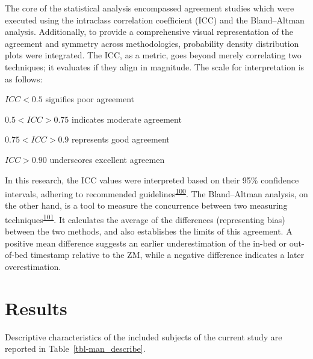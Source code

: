 \documentclass[
  9pt,
]{scrbook}
\begin{document}
The core of the statistical analysis encompassed agreement studies which
were executed using the intraclass correlation coefficient (ICC) and the
Bland--Altman analysis. Additionally, to provide a comprehensive visual
representation of the agreement and symmetry across methodologies,
probability density distribution plots were integrated. The ICC, as a
metric, goes beyond merely correlating two techniques; it evaluates if
they align in magnitude. The scale for interpretation is as follows:

\(ICC < 0.5\) signifies poor agreement

\(0.5 < ICC > 0.75\) indicates moderate agreement

\(0.75 < ICC > 0.9\) represents good agreement

\(ICC > 0.90\) underscores excellent agreemen

In this research, the ICC values were interpreted based on their 95\%
confidence intervals, adhering to recommended
guidelines\textsuperscript{\protect\hyperlink{ref-koo_guideline_2016}{100}}.
The Bland--Altman analysis, on the other hand, is a tool to measure the
concurrence between two measuring
techniques\textsuperscript{\protect\hyperlink{ref-bland_measuring_1999}{101}}.
It calculates the average of the differences (representing bias) between
the two methods, and also establishes the limits of this agreement. A
positive mean difference suggests an earlier underestimation of the
in-bed or out-of-bed timestamp relative to the ZM, while a negative
difference indicates a later overestimation.

\hypertarget{results}{%
\section{Results}\label{results}}

Descriptive characteristics of the included subjects of the current
study are reported in Table~\ref{tbl-man_describe}.

\begingroup

\footnotesize
\end{document}
